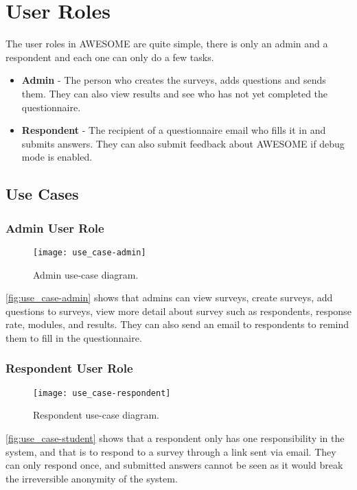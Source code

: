 	\section{User Roles}
	
	The user roles in \ac{AWESOME} are quite simple, there is only an admin and a respondent and each one can only do a few tasks.
	
	\begin{itemize}
		\item \textbf{Admin} - The person who creates the surveys, adds questions and sends them. They can also view results and see who has not yet completed the questionnaire.
		\item \textbf{Respondent} - The recipient of a questionnaire email who fills it in and submits answers. They can also submit feedback about \ac{AWESOME} if debug mode is enabled.
	\end{itemize}
	
	\subsection{Use Cases}
	
	\subsubsection{Admin User Role}
	
	\begin{figure}[h]
		\texttt{[image: use\_case-admin]}
		\caption{Admin use-case diagram.}
		\label{fig:use_case-admin}
	\end{figure}
	
	\autoref{fig:use_case-admin} shows that admins can view surveys, create surveys, add questions to surveys, view more detail about survey such as respondents, response rate, modules, and results. They can also send an email to respondents to remind them to fill in the questionnaire.
	
	\newpage
	
	\subsubsection{Respondent User Role}
	
	\begin{figure}[h]
		\texttt{[image: use\_case-respondent]}
		\caption{Respondent use-case diagram.}
		\label{fig:use_case-student}
	\end{figure}
	
	\autoref{fig:use_case-student} shows that a respondent only has one responsibility in the system, and that is to respond to a survey through a link sent via email. They can only respond once, and submitted answers cannot be seen as it would break the irreversible anonymity of the system.
